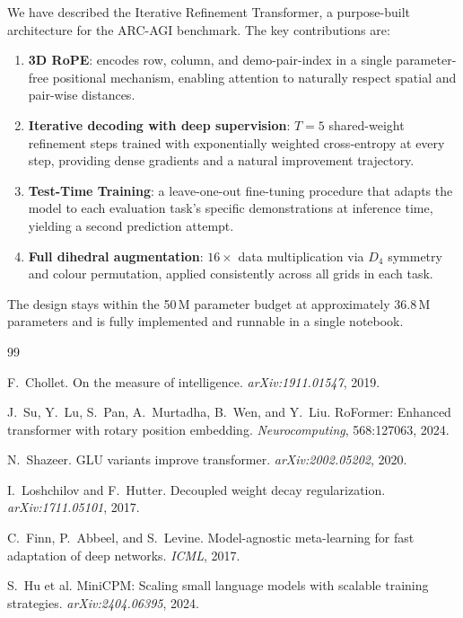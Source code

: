 \documentclass[11pt,a4paper]{article}
\begin{document}
We have described the Iterative Refinement Transformer, a purpose-built architecture
for the ARC-AGI benchmark.  The key contributions are:
\begin{enumerate}[noitemsep]
  \item \textbf{3D RoPE}: encodes row, column, and demo-pair-index in a single
        parameter-free positional mechanism, enabling attention to naturally respect
        spatial and pair-wise distances.
  \item \textbf{Iterative decoding with deep supervision}: $T{=}5$ shared-weight
        refinement steps trained with exponentially weighted cross-entropy at every
        step, providing dense gradients and a natural improvement trajectory.
  \item \textbf{Test-Time Training}: a leave-one-out fine-tuning procedure that adapts
        the model to each evaluation task's specific demonstrations at inference time,
        yielding a second prediction attempt.
  \item \textbf{Full dihedral augmentation}: $16\times$ data multiplication via $D_4$
        symmetry and colour permutation, applied consistently across all grids in each
        task.
\end{enumerate}
The design stays within the 50\,M parameter budget at approximately 36.8\,M parameters
and is fully implemented and runnable in a single notebook.

\begin{thebibliography}{99}

F.\ Chollet.
\newblock On the measure of intelligence.
\newblock \textit{arXiv:1911.01547}, 2019.

J.\ Su, Y.\ Lu, S.\ Pan, A.\ Murtadha, B.\ Wen, and Y.\ Liu.
\newblock RoFormer: Enhanced transformer with rotary position embedding.
\newblock \textit{Neurocomputing}, 568:127063, 2024.

N.\ Shazeer.
\newblock GLU variants improve transformer.
\newblock \textit{arXiv:2002.05202}, 2020.

I.\ Loshchilov and F.\ Hutter.
\newblock Decoupled weight decay regularization.
\newblock \textit{arXiv:1711.05101}, 2017.

C.\ Finn, P.\ Abbeel, and S.\ Levine.
\newblock Model-agnostic meta-learning for fast adaptation of deep networks.
\newblock \textit{ICML}, 2017.

S.\ Hu et al.
\newblock MiniCPM: Scaling small language models with scalable training strategies.
\newblock \textit{arXiv:2404.06395}, 2024.

\end{thebibliography}
\end{document}
